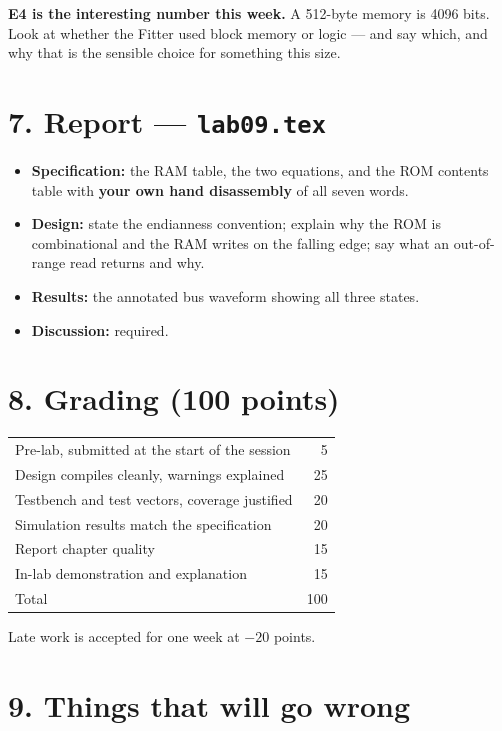 \documentclass[11pt]{article}
\newcommand{\code}[1]{\texttt{#1}}
\begin{document}
\textbf{E4 is the interesting number this week.} A 512-byte memory is 4096 bits.
Look at whether the Fitter used block memory or logic --- and say which, and why
that is the sensible choice for something this size.

\section*{7. Report --- \code{lab09.tex}}

\begin{itemize}[leftmargin=1.6em,itemsep=1pt]
\item \textbf{Specification:} the RAM table, the two equations, and the ROM
contents table with \textbf{your own hand disassembly} of all seven words.
\item \textbf{Design:} state the endianness convention; explain why the ROM is
combinational and the RAM writes on the falling edge; say what an out-of-range
read returns and why.
\item \textbf{Results:} the annotated bus waveform showing all three states.
\item \textbf{Discussion:} required.
\end{itemize}

\section*{8. Grading (100 points)}

\begin{center}
\begin{tabular}{lr}
\toprule
Pre-lab, submitted at the start of the session & 5 \\
Design compiles cleanly, warnings explained & 25 \\
Testbench and test vectors, coverage justified & 20 \\
Simulation results match the specification & 20 \\
Report chapter quality & 15 \\
In-lab demonstration and explanation & 15 \\
\midrule
Total & 100 \\
\bottomrule
\end{tabular}
\end{center}

Late work is accepted for one week at $-20$ points.

\section*{9. Things that will go wrong}
\end{document}
